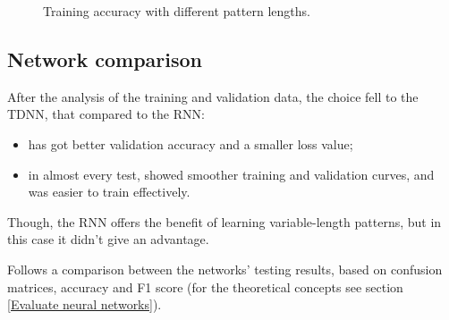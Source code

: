 \begin{center}
	\begin{figure}[ht!]
		\caption{Training accuracy with different pattern lengths.}
	\end{figure}
\end{center}

\subsection{Network comparison}
After the analysis of the training and validation data, the choice fell to the TDNN, that compared to the RNN:
\begin{itemize}
	\item has got better validation accuracy and a smaller loss value;
	\item in almost every test, showed smoother training and validation curves, and was easier to train effectively.
\end{itemize}
Though, the RNN offers the benefit of learning variable-length patterns, but in this case it didn't give an advantage.
\bigbreak

Follows a comparison between the networks' testing results, based on confusion matrices, accuracy and F1 score (for the theoretical concepts see section \ref{Evaluate neural networks}).

